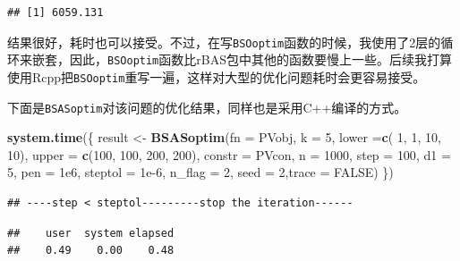 \documentclass[]{ctexbook}
\newenvironment{Shaded}{\begin{snugshade}}{\end{snugshade}}
\newcommand{\KeywordTok}[1]{\textcolor[rgb]{0.13,0.29,0.53}{\textbf{#1}}}
\newcommand{\DataTypeTok}[1]{\textcolor[rgb]{0.13,0.29,0.53}{#1}}
\newcommand{\DecValTok}[1]{\textcolor[rgb]{0.00,0.00,0.81}{#1}}
\newcommand{\FloatTok}[1]{\textcolor[rgb]{0.00,0.00,0.81}{#1}}
\newcommand{\StringTok}[1]{\textcolor[rgb]{0.31,0.60,0.02}{#1}}
\newcommand{\OtherTok}[1]{\textcolor[rgb]{0.56,0.35,0.01}{#1}}
\newcommand{\OperatorTok}[1]{\textcolor[rgb]{0.81,0.36,0.00}{\textbf{#1}}}
\newcommand{\NormalTok}[1]{#1}
\begin{document}
\begin{verbatim}
## [1] 6059.131
\end{verbatim}

结果很好，耗时也可以接受。不过，在写\texttt{BSOoptim}函数的时候，我使用了2层的循环来嵌套，因此，\texttt{BSOoptim}函数比rBAS包中其他的函数要慢上一些。后续我打算使用Rcpp把\texttt{BSOoptim}重写一遍，这样对大型的优化问题耗时会更容易接受。

下面是\texttt{BSASoptim}对该问题的优化结果，同样也是采用C++编译的方式。

\begin{Shaded}
\begin{Highlighting}[]
\KeywordTok{system.time}\NormalTok{(\{}
\NormalTok{  result <-}\StringTok{ }\KeywordTok{BSASoptim}\NormalTok{(}\DataTypeTok{fn =}\NormalTok{ PVobj,}
                      \DataTypeTok{k =} \DecValTok{5}\NormalTok{,}
                      \DataTypeTok{lower =}\KeywordTok{c}\NormalTok{( }\DecValTok{1}\NormalTok{, }\DecValTok{1}\NormalTok{, }\DecValTok{10}\NormalTok{, }\DecValTok{10}\NormalTok{),}
                      \DataTypeTok{upper =} \KeywordTok{c}\NormalTok{(}\DecValTok{100}\NormalTok{, }\DecValTok{100}\NormalTok{, }\DecValTok{200}\NormalTok{, }\DecValTok{200}\NormalTok{),}
                      \DataTypeTok{constr =}\NormalTok{ PVcon,}
                      \DataTypeTok{n =} \DecValTok{1000}\NormalTok{,}
                      \DataTypeTok{step =} \DecValTok{100}\NormalTok{,}
                      \DataTypeTok{d1 =} \DecValTok{5}\NormalTok{,}
                      \DataTypeTok{pen =} \FloatTok{1e6}\NormalTok{,}
                      \DataTypeTok{steptol =} \FloatTok{1e-6}\NormalTok{,}
                      \DataTypeTok{n_flag =} \DecValTok{2}\NormalTok{,}
                      \DataTypeTok{seed =} \DecValTok{2}\NormalTok{,}\DataTypeTok{trace =} \OtherTok{FALSE}\NormalTok{)}
\NormalTok{\})}
\end{Highlighting}
\end{Shaded}

\begin{verbatim}
## ----step < steptol---------stop the iteration------
\end{verbatim}

\begin{verbatim}
##    user  system elapsed 
##    0.49    0.00    0.48
\end{verbatim}

\begin{Shaded}
\end{Shaded}
\end{document}
